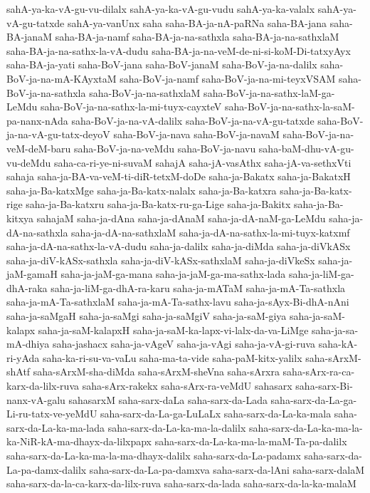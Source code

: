 {sahA-ya-ka-vA-gu-vu-dilalx
sahA-ya-ka-vA-gu-vudu
sahA-ya-ka-valalx
sahA-ya-vA-gu-tatxde
sahA-ya-vanUnx
saha
saha-BA-ja-nA-paRNa
saha-BA-jana
saha-BA-janaM
saha-BA-ja-namf
saha-BA-ja-na-sathxla
saha-BA-ja-na-sathxlaM
saha-BA-ja-na-sathx-la-vA-dudu
saha-BA-ja-na-veM-de-ni-si-koM-Di-tatxyAyx
saha-BA-ja-yati
saha-BoV-jana
saha-BoV-janaM
saha-BoV-ja-na-dalilx
saha-BoV-ja-na-mA-KAyxtaM
saha-BoV-ja-namf
saha-BoV-ja-na-mi-teyxVSAM
saha-BoV-ja-na-sathxla
saha-BoV-ja-na-sathxlaM
saha-BoV-ja-na-sathx-laM-ga-LeMdu
saha-BoV-ja-na-sathx-la-mi-tuyx-cayxteV
saha-BoV-ja-na-sathx-la-saM-pa-nanx-nAda
saha-BoV-ja-na-vA-dalilx
saha-BoV-ja-na-vA-gu-tatxde
saha-BoV-ja-na-vA-gu-tatx-deyoV
saha-BoV-ja-nava
saha-BoV-ja-navaM
saha-BoV-ja-na-veM-deM-baru
saha-BoV-ja-na-veMdu
saha-BoV-ja-navu
saha-baM-dhu-vA-gu-vu-deMdu
saha-ca-ri-ye-ni-suvaM
sahajA
saha-jA-vasAthx
saha-jA-va-sethxVti
sahaja
saha-ja-BA-va-veM-ti-diR-tetxM-doDe
saha-ja-Bakatx
saha-ja-BakatxH
saha-ja-Ba-katxMge
saha-ja-Ba-katx-nalalx
saha-ja-Ba-katxra
saha-ja-Ba-katx-rige
saha-ja-Ba-katxru
saha-ja-Ba-katx-ru-ga-Lige
saha-ja-Bakitx
saha-ja-Ba-kitxya
sahajaM
saha-ja-dAna
saha-ja-dAnaM
saha-ja-dA-naM-ga-LeMdu
saha-ja-dA-na-sathxla
saha-ja-dA-na-sathxlaM
saha-ja-dA-na-sathx-la-mi-tuyx-katxmf
saha-ja-dA-na-sathx-la-vA-dudu
saha-ja-dalilx
saha-ja-diMda
saha-ja-diVkASx
saha-ja-diV-kASx-sathxla
saha-ja-diV-kASx-sathxlaM
saha-ja-diVkeSx
saha-ja-jaM-gamaH
saha-ja-jaM-ga-mana
saha-ja-jaM-ga-ma-sathx-lada
saha-ja-liM-ga-dhA-raka
saha-ja-liM-ga-dhA-ra-karu
saha-ja-mATaM
saha-ja-mA-Ta-sathxla
saha-ja-mA-Ta-sathxlaM
saha-ja-mA-Ta-sathx-lavu
saha-ja-sAyx-Bi-dhA-nAni
saha-ja-saMgaH
saha-ja-saMgi
saha-ja-saMgiV
saha-ja-saM-giya
saha-ja-saM-kalapx
saha-ja-saM-kalapxH
saha-ja-saM-ka-lapx-vi-lalx-da-va-LiMge
saha-ja-sa-mA-dhiya
saha-jashacx
saha-ja-vAgeV
saha-ja-vAgi
saha-ja-vA-gi-ruva
saha-kA-ri-yAda
saha-ka-ri-su-va-vaLu
saha-ma-ta-vide
saha-paM-kitx-yalilx
saha-sArxM-shAtf
saha-sArxM-sha-diMda
saha-sArxM-sheVna
saha-sArxra
saha-sArx-ra-ca-karx-da-lilx-ruva
saha-sArx-rakekx
saha-sArx-ra-veMdU
sahasarx
saha-sarx-Bi-nanx-vA-galu
sahasarxM
saha-sarx-daLa
saha-sarx-da-Lada
saha-sarx-da-La-ga-Li-ru-tatx-ve-yeMdU
saha-sarx-da-La-ga-LuLaLx
saha-sarx-da-La-ka-mala
saha-sarx-da-La-ka-ma-lada
saha-sarx-da-La-ka-ma-la-dalilx
saha-sarx-da-La-ka-ma-la-ka-NiR-kA-ma-dhayx-da-lilxpapx
saha-sarx-da-La-ka-ma-la-maM-Ta-pa-dalilx
saha-sarx-da-La-ka-ma-la-ma-dhayx-dalilx
saha-sarx-da-La-padamx
saha-sarx-da-La-pa-damx-dalilx
saha-sarx-da-La-pa-damxva
saha-sarx-da-lAni
saha-sarx-dalaM
saha-sarx-da-la-ca-karx-da-lilx-ruva
saha-sarx-da-lada
saha-sarx-da-la-ka-malaM
}

